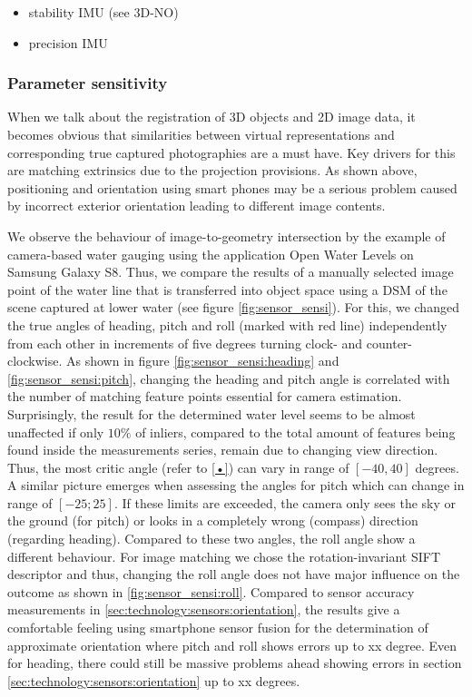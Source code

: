 \documentclass[review]{elsarticle}
\begin{document}
\begin{itemize}
\item stability IMU (see 3D-NO)
\item precision IMU
\end{itemize}

\subsubsection{Parameter sensitivity}
\label{sec:technology:sensors:sensitivity}
When we talk about the registration of 3D objects and 2D image data, it becomes obvious that similarities between virtual representations and corresponding true captured photographies are a must have. Key drivers for this are matching extrinsics due to the projection provisions. As shown above, positioning and orientation using smart phones may be a serious problem caused by incorrect exterior orientation leading to different image contents. 

We observe the behaviour of image-to-geometry intersection by the example of camera-based water gauging using the application Open Water Levels on Samsung Galaxy S8. Thus, we compare the results of a manually selected image point of the water line that is transferred into object space using a \gls{DSM} of the scene captured at lower water (see figure \ref{fig:sensor_sensi}). For this, we changed the true angles of heading, pitch and roll (marked with red line) independently from each other in increments of five degrees turning clock- and counter-clockwise.
As shown in figure \ref{fig:sensor_sensi:heading} and \ref{fig:sensor_sensi:pitch}, changing the heading and pitch angle is correlated with the number of matching feature points essential for camera estimation. Surprisingly, the result for the determined water level seems to be almost unaffected if only $10\%$ of inliers, compared to the total amount of features being found inside the measurements series, remain due to changing view direction. Thus, the most critic angle (refer to \ref{•}) can vary in range of $[-40,40]$ degrees. A similar picture emerges when assessing the angles for pitch which can change in range of $[-25;25]$. If these limits are exceeded, the camera only sees the sky or the ground (for pitch) or looks in a completely wrong (compass) direction (regarding heading). Compared to these two angles, the roll angle show a different behaviour. For image matching we chose the rotation-invariant \gls{SIFT} descriptor \cite{Lowe2004} and thus, changing the roll angle does not have major influence on the outcome as shown in \ref{fig:sensor_sensi:roll}.
Compared to sensor accuracy measurements in \ref{sec:technology:sensors:orientation}, the results give a comfortable feeling using smartphone sensor fusion for the determination of approximate orientation where pitch and roll shows errors up to xx degree. Even for heading, there could still be massive problems ahead showing errors in section  \ref{sec:technology:sensors:orientation} up to xx degrees.
\end{document}
